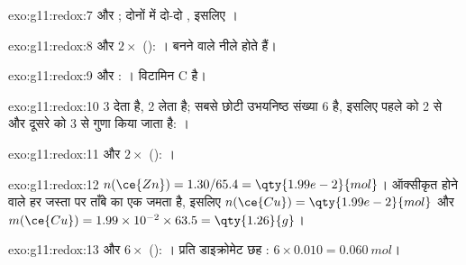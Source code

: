 \begin{solution}{exo:g11:redox:7}
 और ; दोनों में दो-दो
, इसलिए ।
\end{solution}

\begin{solution}{exo:g11:redox:8}
 और $2\times$ ():
। बनने वाले   नीले होते हैं।
\end{solution}

\begin{solution}{exo:g11:redox:9}
 और :
। विटामिन C  है।
\end{solution}

\begin{solution}{exo:g11:redox:10}
 3  देता है, 
2 लेता है; सबसे छोटी उभयनिष्ठ संख्या 6 है, इसलिए पहले को
2 से और दूसरे को 3 से गुणा किया जाता है: ।
\end{solution}

\begin{solution}{exo:g11:redox:11}
 और $2\times$ ():
।
\end{solution}

\begin{solution}{exo:g11:redox:12}
$n(\ce{Zn}) = 1.30/65.4 = \qty{1.99e-2}{mol}$। ऑक्सीकृत होने वाले हर जस्ता 
पर ताँबे का एक  जमता है, इसलिए $n(\ce{Cu}) = \qty{1.99e-2}{mol}$
और $m(\ce{Cu}) = 1.99\times 10^{-2} \times 63.5 = \qty{1.26}{g}$।
\end{solution}

\begin{solution}{exo:g11:redox:13}
 और
$6\times$ ():
।
प्रति डाइक्रोमेट  छह : $6 \times 0.010 = \qty{0.060}{mol}$।
\end{solution}

